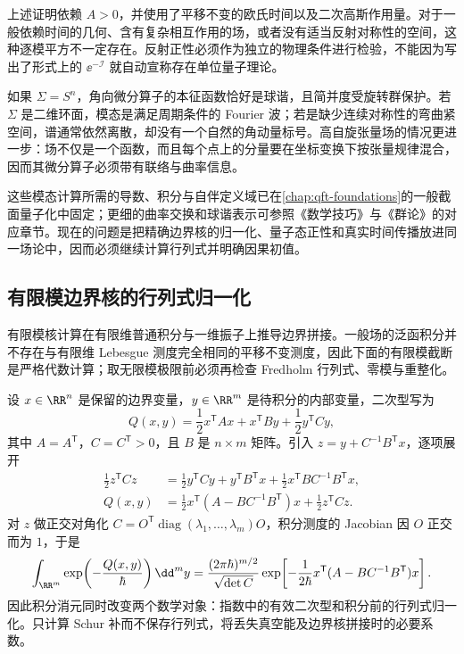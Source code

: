 上述证明依赖 $A>0$，并使用了平移不变的欧氏时间以及二次高斯作用量。对于一般依赖时间的几何、含有复杂相互作用的场，或者没有适当反射对称性的空间，这种逐模平方不一定存在。反射正性必须作为独立的物理条件进行检验，不能因为写出了形式上的 $\ee^{-\mathscr I}$ 就自动宣称存在单位量子理论。


如果 $\Sigma=S^{n}$，角向微分算子的本征函数恰好是球谐，且简并度受旋转群保护。若 $\Sigma$ 是二维环面，模态是满足周期条件的 Fourier 波；若是缺少连续对称性的弯曲紧空间，谱通常依然离散，却没有一个自然的角动量标号。高自旋张量场的情况更进一步：场不仅是一个函数，而且每个点上的分量要在坐标变换下按张量规律混合，因而其微分算子必须带有联络与曲率信息。

这些模态计算所需的导数、积分与自伴定义域已在\cref{chap:qft-foundations}的一般截面量子化中固定；更细的曲率交换和球谐表示可参照《数学技巧》与《群论》的对应章节。现在的问题是把精确边界核的归一化、量子态正性和真实时间传播放进同一场论中，因而必须继续计算行列式并明确因果初值。

\subsection{有限模边界核的行列式归一化}
\label{subsec:ghs-r6-gaussian-gluing}

有限模核计算在有限维普通积分与一维振子上推导边界拼接。一般场的泛函积分并不存在与有限维 Lebesgue 测度完全相同的平移不变测度，因此下面的有限模截断是严格代数计算；取无限模极限前必须再检查 Fredholm 行列式、零模与重整化。

\begin{example}

设 $x\in\RR^n$ 是保留的边界变量，$y\in\RR^m$ 是待积分的内部变量，二次型写为
\[
Q(x,y)=\frac12x^{\mathsf T}Ax+x^{\mathsf T}By+
\frac12y^{\mathsf T}Cy,
\]
其中 $A=A^{\mathsf T}$，$C=C^{\mathsf T}>0$，且 $B$ 是 $n\times m$ 矩阵。引入 $z=y+C^{-1}B^{\mathsf T}x$，逐项展开
\begin{align*}
\frac12z^{\mathsf T}Cz
&=\frac12y^{\mathsf T}Cy+y^{\mathsf T}B^{\mathsf T}x
+\frac12x^{\mathsf T}BC^{-1}B^{\mathsf T}x,\\
Q(x,y)&=\frac12x^{\mathsf T}(A-BC^{-1}B^{\mathsf T})x
+\frac12z^{\mathsf T}Cz.
\end{align*}
对 $z$ 做正交对角化 $C=O^{\mathsf T}\operatorname{diag}(\lambda_1,\ldots,\lambda_m)O$，积分测度的 Jacobian 因 $O$ 正交而为 $1$，于是
\begin{equation}\label{eq:ghs-r6-schur-integral}
\int_{\RR^m}\exp\!\left(-\frac{Q(x,y)}\hbar\right)\dd^my
=\frac{(2\pi\hbar)^{m/2}}{\sqrt{\det C}}
\exp\!\left[-\frac1{2\hbar}x^{\mathsf T}(A-BC^{-1}B^{\mathsf T})x\right].
\end{equation}
因此积分消元同时改变两个数学对象：指数中的有效二次型和积分前的行列式归一化。只计算 Schur 补而不保存行列式，将丢失真空能及边界核拼接时的必要系数。

\end{example}

